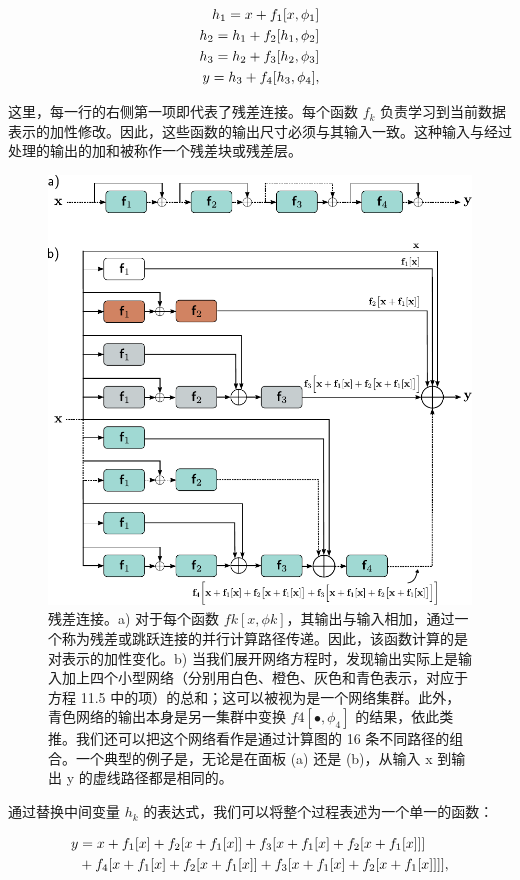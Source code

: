\documentclass[lang=cn,newtx,10pt,scheme=chinese]{elegantbook}
\begin{document}
\begin{align}
h_1 = x + f_1[x, \phi_1] \notag \\
h_2 = h_1 + f_2[h_1, \phi_2] \notag \\
h_3 = h_2 + f_3[h_2, \phi_3] \notag \\
y = h_3 + f_4[h_3, \phi_4], 
\end{align} 


这里，每一行的右侧第一项即代表了残差连接。每个函数 \(f_k\) 负责学习到当前数据表示的加性修改。因此，这些函数的输出尺寸必须与其输入一致。这种输入与经过处理的输出的加和被称作一个残差块或残差层。

\begin{figure}[ht!]
\centering
\includegraphics[width=0.7\linewidth]{PDFFigures/UDLChap11PDF/ResidualUnravel.pdf}
\caption{残差连接。a) 对于每个函数 \(fk[x, \phi k]\)，其输出与输入相加，通过一个称为残差或跳跃连接的并行计算路径传递。因此，该函数计算的是对表示的加性变化。b) 当我们展开网络方程时，发现输出实际上是输入加上四个小型网络（分别用白色、橙色、灰色和青色表示，对应于方程 11.5 中的项）的总和；这可以被视为是一个网络集群。此外，青色网络的输出本身是另一集群中变换 \(f4[•,\phi_4]\) 的结果，依此类推。我们还可以把这个网络看作是通过计算图的 16 条不同路径的组合。一个典型的例子是，无论是在面板 (a) 还是 (b)，从输入 x 到输出 y 的虚线路径都是相同的。}
\end{figure}


通过替换中间变量 \(h_k\) 的表达式，我们可以将整个过程表述为一个单一的函数：

\begin{align}
y &= x + f_1[x] + f_2[x + f_1[x]] + f_3[x + f_1[x] + f_2[x + f_1[x]]] \notag \\
&+ f_4[x + f_1[x] + f_2[x + f_1[x]] + f_3[x + f_1[x] + f_2[x + f_1[x]]]], 
\end{align}
\end{document}
